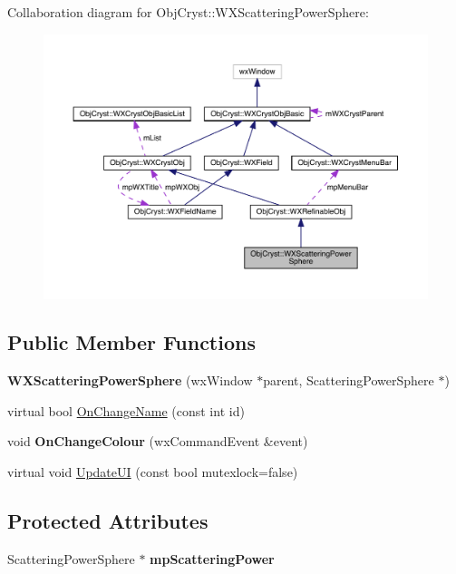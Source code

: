 Collaboration diagram for Obj\+Cryst\+::W\+X\+Scattering\+Power\+Sphere\+:
\nopagebreak
\begin{figure}[H]
\begin{center}
\leavevmode
\includegraphics[width=350pt]{class_obj_cryst_1_1_w_x_scattering_power_sphere__coll__graph}
\end{center}
\end{figure}
\subsection*{Public Member Functions}
\begin{DoxyCompactItemize}
\item 
\mbox{\label{class_obj_cryst_1_1_w_x_scattering_power_sphere_a451416398f3296f4d584de1bfa49658c}} 
{\bfseries W\+X\+Scattering\+Power\+Sphere} (wx\+Window $\ast$parent, Scattering\+Power\+Sphere $\ast$)
\item 
virtual bool \mbox{\hyperlink{class_obj_cryst_1_1_w_x_scattering_power_sphere_a7f3614f0711d1a2ef1fca4a60789129e}{On\+Change\+Name}} (const int id)
\item 
\mbox{\label{class_obj_cryst_1_1_w_x_scattering_power_sphere_a355d570f5d80b6026a04d9a75b6d5107}} 
void {\bfseries On\+Change\+Colour} (wx\+Command\+Event \&event)
\item 
virtual void \mbox{\hyperlink{class_obj_cryst_1_1_w_x_scattering_power_sphere_a2e1eed3ea3e179e57621251cc844be3e}{Update\+UI}} (const bool mutexlock=false)
\end{DoxyCompactItemize}
\subsection*{Protected Attributes}
\begin{DoxyCompactItemize}
\item 
\mbox{\label{class_obj_cryst_1_1_w_x_scattering_power_sphere_ad7c744e98e231b49f0fdc660ea7ae989}} 
Scattering\+Power\+Sphere $\ast$ {\bfseries mp\+Scattering\+Power}
\end{DoxyCompactItemize}



